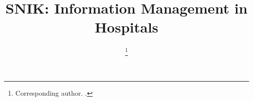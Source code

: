 \documentclass[sw]{iosart2x}
\begin{document}
\begin{frontmatter}

\title{SNIK: Information Management in Hospitals}

\begin{aug}
\author[A]{ %
\thanks{Corresponding author. .}}
\end{aug}


\begin{abstract}
\end{abstract}

\begin{keyword}
\end{keyword}

\end{frontmatter}

\end{document}

